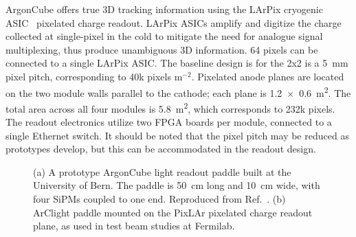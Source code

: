 ArgonCube offers true 3D tracking information using the LArPix cryogenic ASIC~\cite{larpix} pixelated charge readout. LArPix ASICs amplify and digitize the charge collected at single-pixel in the cold to mitigate the need for analogue signal multiplexing, thus produce unambiguous 3D information. 64 pixels can be connected to a single LArPix ASIC. The baseline design is for the 2x2 is a \SI{5}{\milli\metre} pixel pitch, corresponding to 40k pixels m$^{-2}$. Pixelated anode planes are located on the two module walls parallel to the cathode; each plane is \SI[product-units=repeat]{1.2x0.6}{\metre\squared}. The total area across all four modules is \SI{5.8}{\metre\squared}, which corresponds to 232k pixels. The readout electronics utilize two FPGA boards per module, connected to a single Ethernet switch. It should be noted that the pixel pitch may be reduced as prototypes develop, but this can be accommodated in the readout design. 

\begin{figure}[!ht]
	\centering
	\caption{(a) A prototype ArgonCube light readout paddle built at the University of Bern. The paddle is 50~cm long and 10~cm wide, with four SiPMs coupled to one end. Reproduced from Ref.~\cite{argoncube_loi}. (b) ArClight paddle mounted on the PixLAr pixelated charge readout plane, as used in test beam studies at Fermilab.}
	\label{fig:arclight}
\end{figure}

